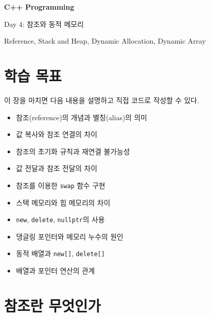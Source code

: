 \documentclass[11pt,a4paper]{article}
\begin{document}
\begin{titlepage}
    \centering
    \vspace*{3cm}

    {\Huge\bfseries C++ Programming\par}
    \vspace{0.8cm}
    {\LARGE Day 4: 참조와 동적 메모리\par}

    \vspace{2cm}

    {\large Reference, Stack and Heap, Dynamic Allocation, Dynamic Array\par}

    \vfill

\end{titlepage}

\tableofcontents
\newpage

\section{학습 목표}

\begin{learningbox}
이 장을 마치면 다음 내용을 설명하고 직접 코드로 작성할 수 있다.
\begin{itemize}[leftmargin=1.5em]
    \item 참조(reference)의 개념과 별칭(alias)의 의미
    \item 값 복사와 참조 연결의 차이
    \item 참조의 초기화 규칙과 재연결 불가능성
    \item 값 전달과 참조 전달의 차이
    \item 참조를 이용한 \texttt{swap} 함수 구현
    \item 스택 메모리와 힙 메모리의 차이
    \item \texttt{new}, \texttt{delete}, \texttt{nullptr}의 사용
    \item 댕글링 포인터와 메모리 누수의 원인
    \item 동적 배열과 \texttt{new[]}, \texttt{delete[]}
    \item 배열과 포인터 연산의 관계
\end{itemize}
\end{learningbox}

\section{참조란 무엇인가}
\end{document}
